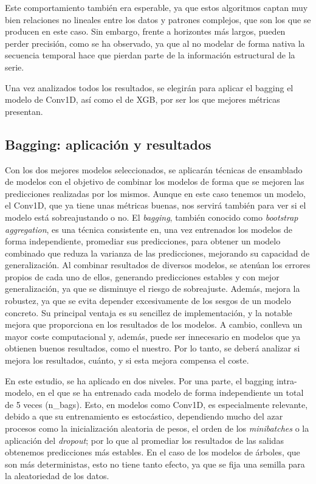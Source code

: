 \documentclass[a4paper,onecolumn]{extarticle}
\begin{document}
\begin{sloppypar}
Este comportamiento también era esperable, ya que estos algoritmos captan muy bien relaciones no lineales entre los datos y patrones complejos, que son los que se producen en 
este caso. Sin embargo, frente a horizontes más largos, pueden perder precisión, como se ha observado, ya que al no modelar de forma nativa la secuencia temporal hace que pierdan 
parte de la información estructural de la serie.

Una vez analizados todos los resultados, se elegirán para aplicar el bagging el modelo de Conv1D, así como el de XGB, por ser los que mejores métricas presentan.

\subsection{Bagging: aplicación y resultados} \label{bagging}
Con los dos mejores modelos seleccionados, se aplicarán técnicas de ensamblado de modelos con el objetivo de combinar los modelos de forma que se mejoren las predicciones 
realizadas por los mismos. Aunque en este caso tenemos un modelo, el Conv1D, que ya tiene unas métricas buenas, nos servirá también para ver si el modelo está sobreajustando o no.
El \textit{bagging}, también conocido como \textit{bootstrap aggregation}, es una técnica consistente en, una vez entrenados los modelos de forma independiente, promediar sus 
predicciones, para obtener un modelo combinado que reduza la varianza de las predicciones, mejorando su capacidad de generalización. Al combinar resultados de diversos modelos, 
se atenúan los errores propios de cada uno de ellos, generando predicciones estables y con mejor generalización, ya que se disminuye el riesgo de sobreajuste. Además, mejora la 
robustez, ya que se evita depender excesivamente de los sesgos de un modelo concreto. Su principal ventaja es su sencillez de implementación, y la notable mejora que proporciona 
en los resultados de los modelos. A cambio, conlleva un mayor coste computacional y, además, puede ser innecesario en modelos que ya obtienen buenos resultados, como el nuestro. 
Por lo tanto, se deberá analizar si mejora los resultados, cuánto, y si esta mejora compensa el coste.

En este estudio, se ha aplicado en dos niveles. Por una parte, el bagging intra-modelo, en el que se ha entrenado cada modelo de forma independiente un total de 5 veces (n\_bags). 
Esto, en modelos como Conv1D, es especialmente relevante, debido a que su entrenamiento es estocástico, dependiendo mucho del azar procesos como la inicialización aleatoria de pesos, 
el orden de los \textit{minibatches} o la aplicación del \textit{dropout}; por lo que al promediar los resultados de las salidas obtenemos predicciones más estables. En el caso de los 
modelos de árboles, que son más deterministas, esto no tiene tanto efecto, ya que se fija una semilla para la aleatoriedad de los datos.


\end{sloppypar}
\end{document}

